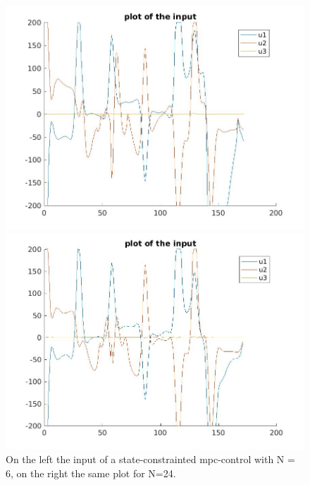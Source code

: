 \documentclass[•]{article}
\begin{document}
\begin{figure}[H]
\begin{minipage}{.45\textwidth}
\includegraphics[width = \textwidth]{mpcinputssconstr6.jpg}
\end{minipage}
\begin{minipage}{.45\textwidth}
\includegraphics[width = \textwidth]{mpcinputssconstr24.jpg}
\end{minipage}
\caption{On the left the input of a state-constrainted mpc-control with N = 6, on the right the same plot for N=24.}
\end{figure}
\end{document}
